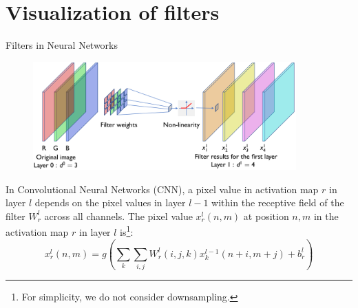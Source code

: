 \documentclass[xcolor=pdftex,dvipsnames,table]{beamer}
\begin{document}


\section{Visualization of filters}

\begin{frame}{Filters in Neural Networks}
\begin{figure}[htb]
\includegraphics[width=0.9\textwidth]{../graphics/CNN_FirstLayer.png}
\end{figure}
In Convolutional Neural Networks (CNN), a pixel value in activation map $r$ in layer $l$ depends on the pixel values in layer $l-1$ within the receptive field of the filter $W^{l}_r$ across all channels. The pixel value $x^{l}_{r}(n,m)$ at position $n,m$ in the activation map $r$ in layer $l$ is\footnote{For simplicity, we do not consider downsampling.}: 
\begin{equation}
	x^{l}_{r}(n,m) = g(\sum_{k}\sum_{i,j}W^{l}_r(i,j,k)x^{l-1}_{k}(n+i,m+j) + b^l_r)
\end{equation} 
\end{frame}
\end{document}
